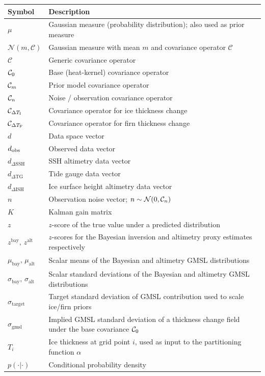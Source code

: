 \begin{longtable}{@{}lp{10cm}@{}}
    \toprule
    \textbf{Symbol} & \textbf{Description} \\
    \midrule
    $\mu$                           & Gaussian measure (probability distribution); also used as prior measure \\
    $\mathcal{N}(m, \mathcal{C})$   & Gaussian measure with mean $m$ and covariance operator $\mathcal{C}$ \\
    $\mathcal{C}$                   & Generic covariance operator \\
    $\mathcal{C}_{0}$                & Base (heat-kernel) covariance operator \\
    $\mathcal{C}_{m}$                & Prior model covariance operator \\
    $\mathcal{C}_{n}$                & Noise / observation covariance operator \\
    $\mathcal{C}_{\Delta T_\text{I}}$ & Covariance operator for ice thickness change \\
    $\mathcal{C}_{\Delta T_\text{F}}$ & Covariance operator for firn thickness change \\
    $d$                             & Data space vector \\
    $d_{\text{obs}}$                         & Observed data vector \\
    $d_{\Delta\mathrm{SSH}}$        & SSH altimetry data vector \\
    $d_{\Delta\mathrm{TG}}$         & Tide gauge data vector \\
    $d_{\Delta\mathrm{ISH}}$        & Ice surface height altimetry data vector \\
    $n$                             & Observation noise vector; $n \sim \mathcal{N}(0, \mathcal{C}_{n})$ \\
    $K$                             & Kalman gain matrix \\
    $z$                             & $z$-score of the true value under a predicted distribution \\
    $z^{\text{bay}},\, z^{\text{alt}}$ & $z$-scores for the Bayesian inversion and altimetry proxy estimates respectively \\
    $\mu_{\text{bay}},\, \mu_{\text{alt}}$ & Scalar means of the Bayesian and altimetry GMSL distributions \\
    $\sigma_{\text{bay}},\, \sigma_{\text{alt}}$ & Scalar standard deviations of the Bayesian and altimetry GMSL distributions \\
    $\sigma_{\text{target}}$        & Target standard deviation of GMSL contribution used to scale ice/firn priors \\
    $\sigma_{\text{gmsl}}$          & Implied GMSL standard deviation of a thickness change field under the base covariance $\mathcal{C}_{0}$ \\
    $T_i$                           & Ice thickness at grid point $i$, used as input to the partitioning function $\alpha$ \\
    $p(\cdot|\cdot)$                & Conditional probability density \\
    \bottomrule
\end{longtable}
